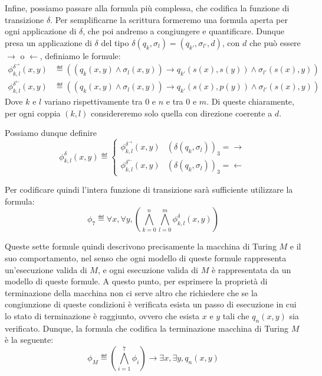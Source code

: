Infine, possiamo passare alla formula più complessa, che codifica la funzione di transizione \(\delta\). Per semplificarne la scrittura formeremo una formula aperta per ogni applicazione di \(\delta\), che poi andremo a congiungere e quantificare. Dunque presa un applicazione di \(\delta\) del tipo \(\delta(q_k, \sigma_l) = (q_{k'}, \sigma_{l'}, d)\), con \(d\) che può essere \(\rightarrow\) o \(\leftarrow\), definiamo le formule:
\begin{equation}
  \begin{aligned}
     \phi^{\delta^{\rightarrow}}_{k,l} (x,y) &\eqdef ((q_k(x,y) \land \sigma_l(x,y)) \to q_{k'}(s(x),s(y)) \land \sigma_{l'}(s(x),y))\\
     \phi^{\delta^{\leftarrow}}_{k,l} (x,y) &\eqdef ((q_k(x,y) \land \sigma_l(x,y)) \to q_{k'}(s(x),p(y)) \land \sigma_{l'}(s(x),y))
  \end{aligned}
\end{equation}
Dove \(k\) e \(l\) variano rispettivamente tra \(0\) e \(n\) e tra \(0\) e \(m\). Di queste chiaramente, per ogni coppia \((k,l)\) considereremo solo quella con direzione coerente a \(d\).

Possiamo dunque definire
\begin{equation}
  \phi^{\delta}_{k,l} (x,y) \eqdef \begin{cases}
    \phi^{\delta^{\rightarrow}}_{k,l} (x,y) & {(\delta(q_k, \sigma_l))}_3 = \rightarrow\\
    \phi^{\delta^{\leftarrow}}_{k,l} (x,y) & {(\delta(q_k, \sigma_l))}_3 = \leftarrow
  \end{cases}
\end{equation}

Per codificare quindi l'intera funzione di transizione sarà sufficiente utilizzare la formula:
\begin{equation}
  \phi_7 \eqdef \forall x, \forall y, \left(\bigwedge_{k=0}^{n} \bigwedge_{l=0}^{m} \phi^{\delta}_{k,l} (x,y)\right)
\end{equation}

Queste sette formule quindi descrivono precisamente la macchina di Turing \(M\) e il suo comportamento, nel senso che ogni modello di queste formule rappresenta un'esecuzione valida di \(M\), e ogni esecuzione valida di \(M\) è rappresentata da un modello di queste formule. A questo punto, per esprimere la proprietà di terminazione della macchina non ci serve altro che richiedere che se la congiunzione di queste condizioni è verificata esista un passo di esecuzione in cui lo stato di terminazione è raggiunto, ovvero che esista \(x\) e \(y\) tali che \(q_n(x,y)\) sia verificato. Dunque, la formula che codifica la terminazione macchina di Turing \(M\) è la seguente:
\begin{equation}
  \phi_M \eqdef \left(\bigwedge_{i=1}^{7} \phi_i\right) \to \exists x, \exists y, q_n(x,y)
\end{equation}

